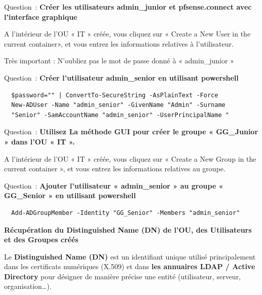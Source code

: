 \vspace{0.5cm}

\noindent Question~: \textbf{Créer les utilisateurs admin\_junior et pfsense.connect avec l'interface graphique}

\noindent A l'intérieur de l'OU « IT » créée, vous cliquez sur « Create a New User in the current container», et vous entrez les informations relatives à l'utilisateur.

\noindent Très important : N'oubliez pas le mot de passe donné à « admin\_junior »

\vspace{0.5cm}

\noindent Question~: \textbf{Créer l'utilisateur admin\_senior en utilisant powershell}

\vspace{0.5cm}

\begin{verbatim}
  $password="" | ConvertTo-SecureString -AsPlainText -Force
  New-ADUser -Name "admin_senior" -GivenName "Admin" -Surname 
  "Senior" -SamAccountName "admin_senior" -UserPrincipalName "
\end{verbatim}

\newpage

\noindent Question~: \textbf{Utilisez La méthode GUI pour créer le groupe « GG\_Junior » dans l'OU « IT ».}

\noindent A l'intérieur de l'OU « IT » créée, vous cliquez sur « Create a New Group in the current container », et vous entrez les informations relatives au groupe.

\vspace{0.5cm}

\noindent Question~: \textbf{Ajouter l'utilisateur « admin\_senior » au groupe « GG\_Senior » en utilisant powershell}

\vspace{0.5cm}

\begin{verbatim}
  Add-ADGroupMember -Identity "GG_Senior" -Members "admin_senior"
\end{verbatim}

\vspace{1cm}

\noindent \textbf{Récupération du Distinguished Name (DN) de l'OU, des Utilisateurs et des
Groupes créés}

\noindent Le \textbf{Distinguished Name (DN)} est un identifiant unique utilisé principalement dans les certificats numériques (X.509) et dans \textbf{les annuaires LDAP / Active Directory} pour désigner de manière précise une entité (utilisateur, serveur, organisation…).

